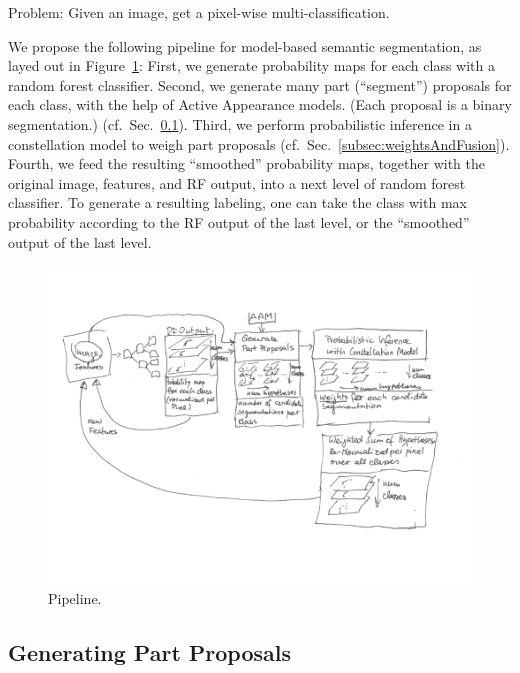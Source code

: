 \documentclass[10pt,twocolumn,letterpaper]{article}
\begin{document}
Problem: Given an image, get a pixel-wise multi-classification. 

We propose the following pipeline for model-based semantic segmentation, as layed out in Figure~\ref{fig:pipeline}: 
%
First, we generate probability maps for each class with a random forest classifier.
%
Second, we generate many part ("`segment"') proposals for each class, with the help of Active Appearance models. 
(Each proposal is a binary segmentation.) (cf.\ Sec.\ \ref{subsec:hyps}). 
%
Third, we perform probabilistic inference in a constellation model to weigh part proposals (cf.\ Sec.\ \ref{subsec:weightsAndFusion}). 
%
Fourth, we feed the resulting "`smoothed"' probability maps, together with the original image, features, and RF output, into a next level of random forest classifier. 
%
To generate a resulting labeling, one can take the class with max probability according to the RF output of the last level, or the "`smoothed"' output of the last level. 


\begin{figure}[t]
\begin{center}
\includegraphics[width=\textwidth]{Pipeline.png} %
\caption{Pipeline.}
\label{fig:pipeline}
\end{center}
\end{figure}

\subsection{Generating Part Proposals}
\label{subsec:hyps}
\end{document}

